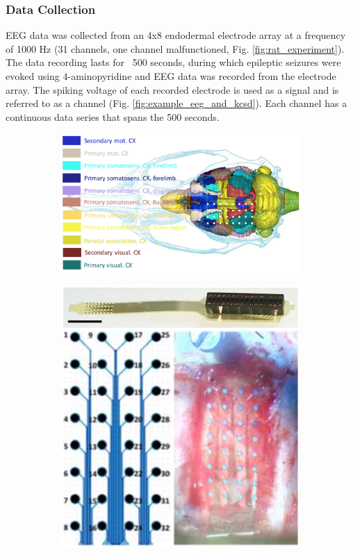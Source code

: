 \documentclass[journal,12pt,onecolumn,draftclsnofoot]{IEEEtran}  %
\begin{document}
\subsubsection{Data Collection}
EEG data was collected from an 4x8 endodermal electrode array at a frequency of 1000 Hz (31 channels, one channel malfunctioned, Fig. \ref{fig:rat_experiment}). The data recording lasts for ~500 seconds, during which epileptic seizures were evoked using 4-aminopyridine and EEG data was recorded from the electrode array. The spiking voltage of each recorded electrode is used as a signal and is referred to as a channel (Fig. \ref{fig:example_eeg_and_kcsd}). Each channel has a continuous data series that spans the 500 seconds.

\begin{figure}[H]
  \centering
  \begin{subfigure}[b]{0.45\textwidth}
    \includegraphics[width=0.95\linewidth]{figures/rat_brain_schematic.png}
    \caption{}
  \end{subfigure}
  \begin{subfigure}[b]{0.45\textwidth}
    \centering
    \includegraphics[width=0.95\linewidth]{figures/rat_scull_and_instrument.png}

\end{subfigure}
\end{figure}
\end{document}
